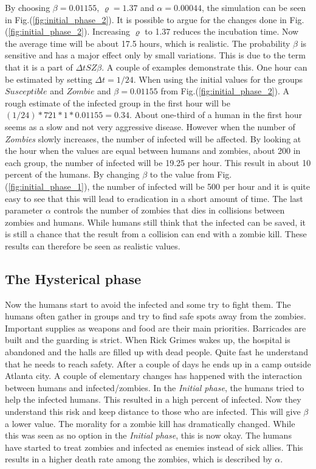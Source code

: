 \documentclass[%
twoside,                 %
final,                   %
chapterprefix=true,      %
open=right               %
10pt]{book}
\begin{document}
By choosing $\beta = 0.01155$, $\varrho=1.37$ and $\alpha=0.00044$, the simulation can be seen in Fig.(\ref{fig:initial_phase_2}). It is possible to argue for the changes done in Fig.(\ref{fig:initial_phase_2}). Increasing $\varrho$ to 1.37 reduces the incubation time. Now the average time will be about 17.5 hours, which is realistic. The probability $\beta$ is sensitive and has a major effect only by small variations. This is due to the term that it is a part of $\Delta t SZ \beta$. A couple of examples demonstrate this. One hour can be estimated by setting $\Delta t = 1/24$. When using the initial values for the groups $Susceptible$ and $Zombie$ and $\beta=0.01155$ from Fig.(\ref{fig:initial_phase_2}). A rough estimate of the infected group in the first hour will be $(1/24)*721*1*0.01155=0.34$. About one-third of a human in the first hour seems as a slow and not very aggressive disease. However when the number of \emph{Zombies} slowly increases, the number of infected will be affected. By looking at the hour when the values are equal between humans and zombies, about 200 in each group, the number of infected will be 19.25 per hour. This result in about 10 percent of the humans. By changing $\beta$ to the value from Fig.(\ref{fig:initial_phase_1}), the number of infected will be 500 per hour and it is quite easy to see that this will lead to eradication in a short amount of time. The last parameter $\alpha$ controls the number of zombies that dies in collisions between zombies and humans. While humans still think that the infected can be saved, it is still a chance that the result from a collision can end with a zombie kill. These results can therefore be seen as realistic values.

\subsection{The Hysterical phase}
Now the humans start to avoid the infected and some try to fight them. The humans often gather in groups and try to find safe spots away from the zombies. Important supplies as weapons and food are their main priorities. Barricades are built and the guarding is strict. When Rick Grimes wakes up, the hospital is abandoned and the halls are filled up with dead people. Quite fast he understand that he needs to reach safety. After a couple of days he ends up in a camp outside Atlanta city. A couple of elementary changes has happened with the interaction between humans and infected/zombies. In the \emph{Initial phase}, the humans tried to help the infected humans. This resulted in a high percent of infected. Now they understand this risk and keep distance to those who are infected. This will give $\beta$ a lower value. The morality for a zombie kill has dramatically changed. While this was seen as no option in the \emph{Initial phase}, this is now okay. The humans have started to treat zombies and infected as enemies instead of sick allies. This results in a higher death rate among the zombies, which is described by $\alpha$. 
\end{document}
